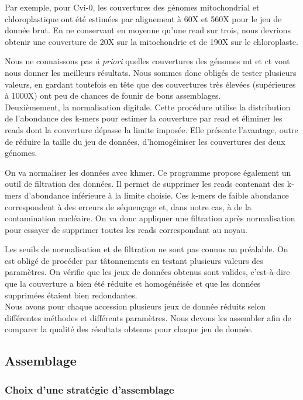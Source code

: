 \documentclass[a4paper]{article}
\begin{document}
Par exemple, pour Cvi-0, les couvertures des génomes mitochondrial et chloroplastique ont été estimées par alignement à 60X et 560X pour le jeu de donnée brut. En ne conservant en moyenne qu'une read sur trois, nous devrions obtenir une couverture de 20X sur la mitochondrie et de 190X sur le chloroplaste. 

Nous ne connaissons pas \textit{à priori} quelles couvertures des génomes mt et ct vont nous donner les meilleurs résultats. Nous sommes donc obligés de tester plusieurs valeurs, en gardant toutefois en tête que des couvertures très élevées (supérieures à 1000X) ont peu de chances de founir de bons assemblages.\\

Deuxièmement, la normalisation digitale. Cette procédure utilise la distribution de l'abondance des k-mers pour estimer la couverture par read et éliminer les reads dont la couverture dépasse la limite imposée.\cite{brown2012reference} Elle présente l'avantage, outre de réduire la taille du jeu de données, d'homogéiniser les couvertures des deux génomes.

On va normaliser les données avec khmer. Ce programme propose également un outil de filtration des données. Il permet de supprimer les reads contenant des k-mers d'abondance inférieure à la limite choisie. Ces k-mers de faible abondance correspondent à des erreurs de séquençage et, dans notre cas, à de la contamination nucléaire. On va donc appliquer une filtration après normalisation pour essayer de supprimer toutes les reads correspondant au noyau. 

Les seuils de normalisation et de filtration ne sont pas connus au préalable. On est obligé de procéder par tâtonnements en testant plusieurs valeurs des paramètres. On vérifie que les jeux de données obtenus sont valides, c'est-à-dire que la couverture a bien été réduite et homogénéisée et que les données supprimées étaient bien redondantes.\\ 

Nous avons pour chaque accession plusieurs jeux de donnée réduits selon  différentes méthodes et différents paramètres. Nous devons les assembler afin de comparer la qualité des résultats obtenus pour chaque jeu de donnée. 

\subsection{Assemblage}

\subsubsection{Choix d'une stratégie d'assemblage}
\end{document}
